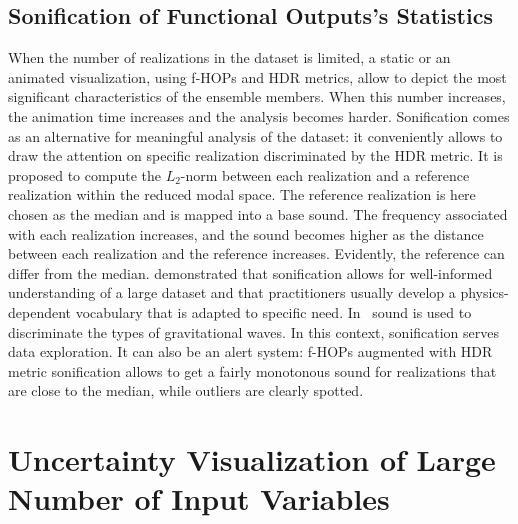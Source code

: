 \subsection{Sonification of Functional Outputs's Statistics}
\label{subsec:sound}

When the number of realizations in the dataset is limited, a static or an animated visualization, using f-HOPs and HDR metrics, allow to depict the most significant characteristics of the ensemble members. When this number increases, the animation time increases and the analysis becomes harder. Sonification comes as an alternative for meaningful analysis of the dataset: it conveniently allows to draw the attention on specific realization discriminated by the HDR metric. It is proposed to compute the $L_2$-norm between each realization and a reference realization within the reduced modal space.  The reference realization is here chosen as the median and is mapped into a base sound. The frequency associated with each realization increases, and the sound becomes higher as the distance between each realization and the reference increases. Evidently, the reference can differ from the median. 
\citep{Alexander2014} demonstrated that sonification allows for well-informed understanding of a large dataset and that practitioners usually develop a physics-dependent vocabulary that is adapted to specific need. In~\citep{Hughes2003} sound is used to discriminate the types of gravitational waves. In this context, sonification serves data exploration. It  can also be an alert system: f-HOPs augmented with HDR metric sonification allows to get a fairly monotonous sound for realizations that are close to the median, while outliers are clearly spotted.%

\section{Uncertainty Visualization of Large Number of Input Variables}
\label{sec:input}

